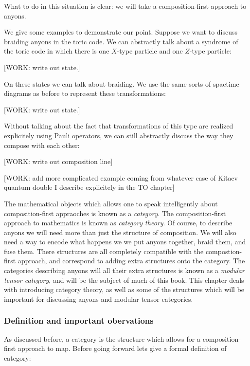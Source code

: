 \documentclass{article}
\theoremstyle{definition}
\newcommand{\0}{\left|0\right>}
\newcommand{\1}{\left|1\right>}
\numberwithin{figure}{section}
\begin{document}
What to do in this situation is clear: we will take a composition-first approach to anyons.

We give some examples to demonstrate our point. Suppose we want to discuss braiding anyons in the toric code. We can abstractly talk about a syndrome of the toric code in which there is one $X$-type particle and one $Z$-type particle:

[WORK: write out state.]

On these states we can talk about braiding. We use the same sorts of spactime diagrams as before to represent these transformations:

[WORK: write out state.]

Without talking about the fact that transformations of this type are realized explicitely using Pauli operators, we can still abstractly discuss the way they compose with each other:

[WORK: write out composition line]

[WORK: add more complicated example coming from whatever case of Kitaev quantum double I describe explicitely in the TO chapter]

The mathematical objects which allows one to speak intelligently about composition-first appraoches is known as a \textit{category}. The composition-first approach to mathematics is known as \textit{category theory}. Of course, to describe anyons we will need more than just the structure of composition. We will also need a way to encode what happens we we put anyons together, braid them, and fuse them. There structures are all completely compatible with the compostion-first approach, and correspond to adding extra structures onto the category. The categories describing anyons will all their extra structures is known as a \textit{modular tensor category}, and will be the subject of much of this book. This chapter deals with introducing category theory, as well as some of the structures which will be important for discussing anyons and modular tensor categories.

\subsubsection{Definition and important obervations}

As discussed before, a category is the structure which allows for a composition-first approach to map. Before going forward lets give a formal definition of category:
\end{document}
